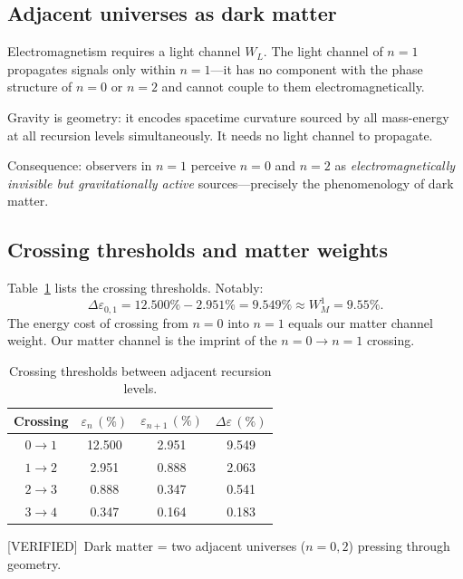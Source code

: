 \documentclass[prd,twocolumn,preprintnumbers,amsmath,amssymb]{revtex4-2}
\newcommand{\verified}{\textcolor{green!60!black}{[VERIFIED]}}
\begin{document}
\subsection{Adjacent universes as dark matter}

Electromagnetism requires a light channel $W_L$.  The light channel
of $n=1$ propagates signals only within $n=1$---it has no component
with the phase structure of $n=0$ or $n=2$ and cannot couple to them
electromagnetically.

Gravity is geometry: it encodes spacetime curvature sourced by all
mass-energy at all recursion levels simultaneously.  It needs no
light channel to propagate.

Consequence: observers in $n=1$ perceive $n=0$ and $n=2$ as
\emph{electromagnetically invisible but gravitationally active}
sources---precisely the phenomenology of dark matter.

\subsection{Crossing thresholds and matter weights}

Table~\ref{tab:crossings} lists the crossing thresholds.  Notably:
\begin{equation}
  \Delta\varepsilon_{0,1} = 12.500\% - 2.951\% = 9.549\%
  \approx W_M^1 = 9.55\%.
  \label{eq:deltaeps01}
\end{equation}
The energy cost of crossing from $n=0$ into $n=1$ equals our matter
channel weight.  Our matter channel is the imprint of the
$n=0 \to n=1$ crossing.

\begin{table}[h]
\caption{Crossing thresholds between adjacent recursion levels.}
\label{tab:crossings}
\begin{ruledtabular}
\begin{tabular}{cccc}
Crossing & $\varepsilon_n\,(\%)$ & $\varepsilon_{n+1}\,(\%)$
         & $\Delta\varepsilon\,(\%)$ \\
\hline
$0 \to 1$ & 12.500 & 2.951 & 9.549 \\
$1 \to 2$ &  2.951 & 0.888 & 2.063 \\
$2 \to 3$ &  0.888 & 0.347 & 0.541 \\
$3 \to 4$ &  0.347 & 0.164 & 0.183 \\
\end{tabular}
\end{ruledtabular}
\end{table}

\verified\ Dark matter = two adjacent universes ($n=0,2$) pressing
through geometry.
\end{document}
